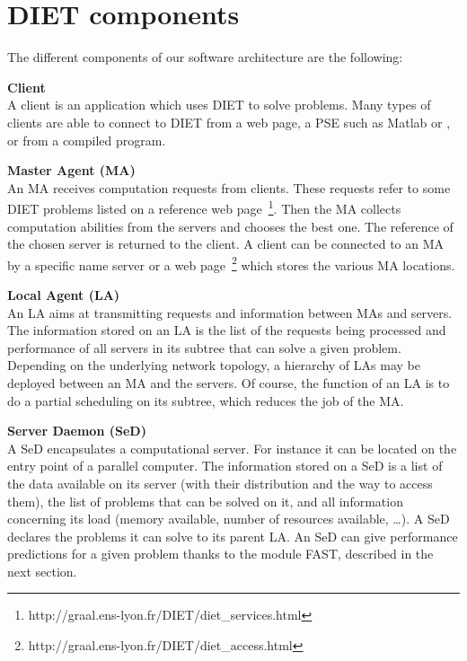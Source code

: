 \section{DIET components}
\label{sec:components}

The different components of our software architecture are the following:      

\begin{description}
\item \textbf{Client}\\
  A client is an application which uses DIET to solve problems.  Many types of clients are able to connect to DIET from a web page, a PSE such as
  Matlab or \sci, or from a compiled program.
\item \textbf{Master Agent (MA)}\\
  An MA receives computation requests from clients. These requests
  refer to some DIET problems listed on a reference web
  page~\footnote{http://graal.ens-lyon.fr/DIET/diet\_services.html}.
  Then the MA collects computation abilities from the servers and
  chooses the best one. The reference of the chosen server is returned
  to the client. A client can be connected to an MA by a specific name
  server or a web
  page~\footnote{http://graal.ens-lyon.fr/DIET/diet\_access.html} which
  stores the various MA locations.

\item \textbf{Local Agent (LA)}\\
  An LA aims at transmitting requests and information between MAs and
  servers.  The information stored on an LA is the list of the
  requests being processed and performance of all servers in its
  subtree that can solve a given problem. Depending on the underlying
  network topology, a hierarchy of LAs may be deployed between an MA
  and the servers. Of course, the function of an LA is to do a partial
  scheduling on its subtree, which reduces the job of the MA.

\item \textbf{Server Daemon (SeD)}\\
  A SeD encapsulates a computational server. For instance it can be
  located on the entry point of a parallel computer. The information
  stored on a SeD is a list of the data available on its server (with
  their distribution and the way to access them), the list of problems
  that can be solved on it, and all information concerning its load
  (memory available, number of resources available, \ldots). A SeD
  declares the problems it can solve to its parent LA.  An SeD can give
  performance predictions for a given problem thanks to the module
  FAST, described in the next section.

\end{description}

